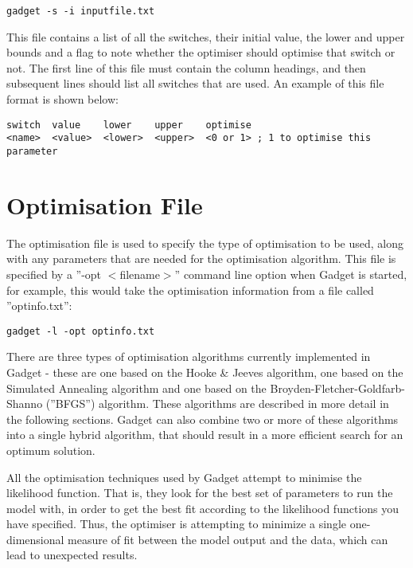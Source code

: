 \documentclass[10pt,twoside]{book}
\begin{document}
{\small\begin{verbatim}
gadget -s -i inputfile.txt
\end{verbatim}}

This file contains a list of all the switches, their initial value, the lower and upper bounds and a flag to note whether the optimiser should optimise that switch or not.  The first line of this file must contain the column headings, and then subsequent lines should list all switches that are used.  An example of this file format is shown below:

{\small\begin{verbatim}
switch  value    lower    upper    optimise
<name>  <value>  <lower>  <upper>  <0 or 1> ; 1 to optimise this parameter
\end{verbatim}}

\chapter{Optimisation File}\label{chap:optim}
The optimisation file is used to specify the type of optimisation to be used, along with any parameters that are needed for the optimisation algorithm.  This file is specified by a ''-opt $<$filename$>$'' command line option when Gadget is started, for example, this would take the optimisation information from a file called ''optinfo.txt'':

{\small\begin{verbatim}
gadget -l -opt optinfo.txt
\end{verbatim}}

There are three types of optimisation algorithms currently implemented in Gadget - these are one based on the Hooke \& Jeeves algorithm, one based on the Simulated Annealing algorithm and one based on the Broyden-Fletcher-Goldfarb-Shanno (''BFGS'') algorithm.  These algorithms are described in more detail in the following sections.  Gadget can also combine two or more of these algorithms into a single hybrid algorithm, that should result in a more efficient search for an optimum solution.

\bigskip
All the optimisation techniques used by Gadget attempt to minimise the likelihood function. That is, they look for the best set of parameters to run the model with, in order to get the best fit according to the likelihood functions you have specified.  Thus, the optimiser is attempting to minimize a single one-dimensional measure of fit between the model output and the data, which can lead to unexpected results.
\end{document}
